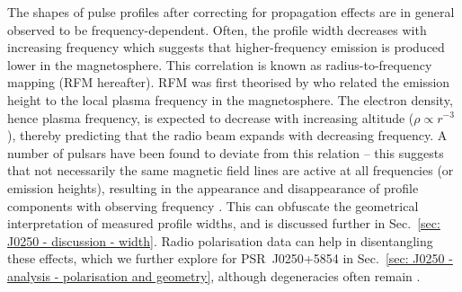 The shapes of pulse profiles after correcting for propagation effects are in general observed to be frequency-dependent. Often, the profile width decreases with increasing frequency which suggests that higher-frequency emission is produced lower in the magnetosphere. This correlation is known as radius-to-frequency mapping (RFM hereafter). RFM was first theorised by \citet{RSxx1975} who related the emission height to the local plasma frequency in the magnetosphere. The electron density, hence plasma frequency, is expected to decrease with increasing altitude ($\rho \propto r^{-3}$), thereby predicting that the radio beam expands with decreasing frequency. A number of pulsars have been found to deviate from this relation \citep[e.g.][]{Txxx1991, CWxx2014, PHS+2016} -- this suggests that not necessarily the same magnetic field lines are active at all frequencies (or emission heights), resulting in the appearance and disappearance of profile components with observing frequency \citep[e.g.][]{Cxxx1978, MRxx2002}. This can obfuscate the geometrical interpretation of measured profile widths, and is discussed further in Sec.~\ref{sec: J0250 - discussion - width}. Radio polarisation data can help in disentangling these effects, which we further explore for PSR~J0250+5854 in Sec.~\ref{sec: J0250 - analysis - polarisation and geometry}, although degeneracies often remain \citep[e.g.][]{KJW+2010}.




